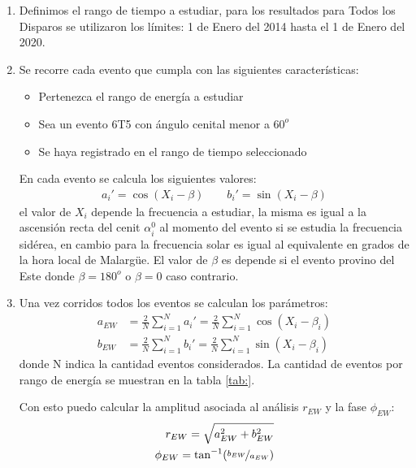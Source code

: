 \begin{enumerate}
    \item Definimos el rango de tiempo a estudiar, para los resultados para Todos los Disparos se utilizaron los límites: 1 de Enero del 2014 hasta el 1 de Enero del 2020.
    \item Se recorre cada evento que cumpla con las siguientes características:
     \begin{itemize}
        \item Pertenezca el rango de energía a estudiar
        \item Sea un evento 6T5 con ángulo cenital menor a $60^o$
        \item Se haya registrado en el rango de tiempo seleccionado
    \end{itemize}
    En cada evento se calcula los siguientes valores:
    \begin{align}
        a_i' = \cos(X_i - \beta) \qquad
        b_i' = \sin(X_i - \beta)
    \end{align}
    el valor de $X_i$ depende la frecuencia a estudiar, la misma es igual a la ascensión recta del cenit $\alpha^0_i$ al momento del evento  si se estudia la frecuencia sidérea, en cambio para la frecuencia solar es igual al equivalente en grados de la hora local de Malargüe. El valor de $\beta$ es depende si el evento provino del Este donde $\beta=180^o$ o $\beta=0$ caso contrario.
    \item Una vez corridos todos los  eventos se calculan los parámetros:
    \begin{align*}
        a_{EW} &= \frac{2}{N} \sum^N_{i=1}a_i' =\frac{2}{N} \sum^N_{i=1} \cos(X_i - \beta_i)\\
        b_{EW} &= \frac{2}{N} \sum^N_{i=1}b_i' =\frac{2}{N} \sum^N_{i=1} \sin(X_i - \beta_i)
    \end{align*}
    donde N indica la cantidad eventos considerados. La cantidad de eventos por rango de energía se muestran en la tabla \ref{tab:}.

    Con esto puedo calcular la amplitud asociada al análisis $r_{EW}$ y la fase $\phi_{EW}$:
    \begin{align*}
        r_{EW} = \sqrt{a_{EW}^2 + b_{EW}^2}\\
        \phi_{EW} = \tan^{-1}(\nicefrac{b_{EW}}{a_{EW}})
    \end{align*}


\end{enumerate}
